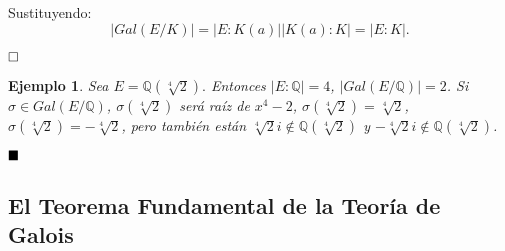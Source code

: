 \documentclass[12pt]{article}
\newtheorem{example}{Ejemplo}[theorem]
\begin{document}
Sustituyendo: $$|Gal(E/K)| = |E:K(a)| |K(a):K| = |E:K|.$$ 


$\hfill \square$

\begin{example}Sea $E = \mathbb{Q}(\sqrt[4]{2}).$ Entonces $|E:\mathbb{Q}| = 4$, $|Gal(E/\mathbb{Q})| = 2$. Si $\sigma \in Gal(E/\mathbb{Q})$, $\sigma(\sqrt[4]{2})$ será raíz de $x^4-2$, $\sigma(\sqrt[4]{2}) = \sqrt[4]{2}$, $\sigma(\sqrt[4]{2}) = -\sqrt[4]{2}$, pero también están $\sqrt[4]{2}i \notin \mathbb{Q}(\sqrt[4]{2})$ y $-\sqrt[4]{2}i \notin \mathbb{Q}(\sqrt[4]{2})$.
\end{example}

$\hfill \blacksquare$



\subsection{El Teorema Fundamental de la Teoría de Galois}
\end{document}
